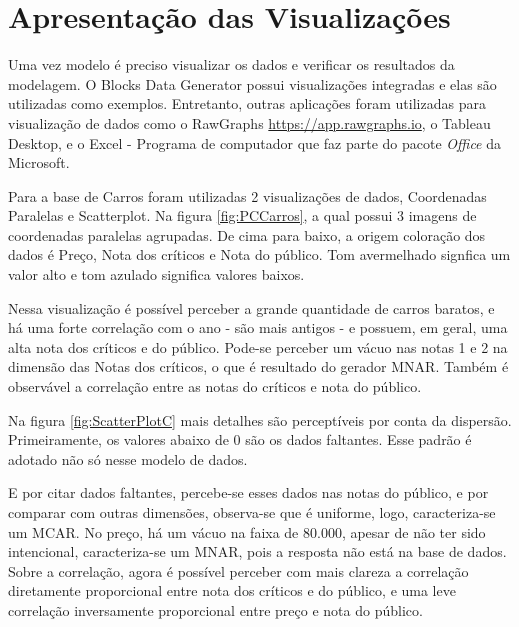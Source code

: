 \documentclass[
	12pt,				%
	openright,			%
	twoside,			%
	a4paper,			%
	english,			%
	brazil				%
	]{abntex2}
\begin{document}
		
	\section{Apresentação das Visualizações}
	Uma vez modelo é preciso visualizar os dados e verificar os resultados da modelagem.
	O Blocks Data Generator possui visualizações integradas e elas são utilizadas como exemplos.
	Entretanto, outras aplicações foram utilizadas para visualização de dados como o RawGraphs \url{https://app.rawgraphs.io}, o Tableau Desktop, e o Excel - Programa de computador que faz parte do pacote \emph{Office} da Microsoft.
	\par

	Para a base de Carros foram utilizadas 2 visualizações de dados, Coordenadas Paralelas e Scatterplot.
	Na figura \ref{fig:PCCarros}, a qual possui 3 imagens de coordenadas paralelas agrupadas.
	De cima para baixo, a origem coloração dos dados é Preço, Nota dos críticos e Nota do público.
	Tom avermelhado signfica um valor alto e tom azulado significa valores baixos.
	\par
	Nessa visualização é possível perceber a grande quantidade de carros baratos, e há uma forte correlação com o ano - são mais antigos - e possuem, em geral, uma alta nota dos críticos e do público.
	Pode-se perceber um vácuo nas notas 1 e 2 na dimensão das Notas dos críticos, o que é resultado do gerador MNAR.
	Também é observável a correlação entre as notas do críticos e nota do público.
	\par
	Na figura \ref{fig:ScatterPlotC} mais detalhes são perceptíveis por conta da dispersão.
	Primeiramente, os valores abaixo de 0 são os dados faltantes.
	Esse padrão é adotado não só nesse modelo de dados.
	\par
	E por citar dados faltantes, percebe-se esses dados nas notas do público, e por comparar com outras dimensões, observa-se que é uniforme, logo, caracteriza-se um MCAR.
	No preço, há um vácuo na faixa de 80.000, apesar de não ter sido intencional, caracteriza-se um MNAR, pois a resposta não está na base de dados.
	Sobre a correlação, agora é possível perceber com mais clareza a correlação diretamente proporcional entre nota dos críticos e do público, e uma leve correlação inversamente proporcional entre preço e nota do público.
	\par
\end{document}
